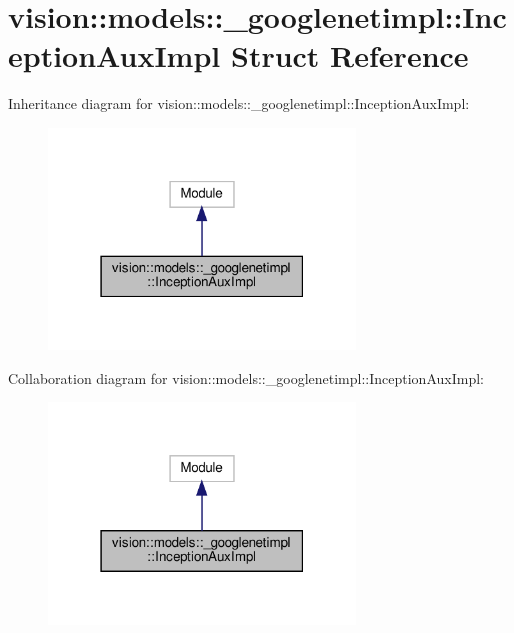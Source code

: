 \hypertarget{structvision_1_1models_1_1__googlenetimpl_1_1InceptionAuxImpl}{}\section{vision\+:\+:models\+:\+:\+\_\+googlenetimpl\+:\+:Inception\+Aux\+Impl Struct Reference}
\label{structvision_1_1models_1_1__googlenetimpl_1_1InceptionAuxImpl}


Inheritance diagram for vision\+:\+:models\+:\+:\+\_\+googlenetimpl\+:\+:Inception\+Aux\+Impl\+:
\nopagebreak
\begin{figure}[H]
\begin{center}
\leavevmode
\includegraphics[width=231pt]{structvision_1_1models_1_1__googlenetimpl_1_1InceptionAuxImpl__inherit__graph}
\end{center}
\end{figure}


Collaboration diagram for vision\+:\+:models\+:\+:\+\_\+googlenetimpl\+:\+:Inception\+Aux\+Impl\+:
\nopagebreak
\begin{figure}[H]
\begin{center}
\leavevmode
\includegraphics[width=231pt]{structvision_1_1models_1_1__googlenetimpl_1_1InceptionAuxImpl__coll__graph}
\end{center}
\end{figure}
